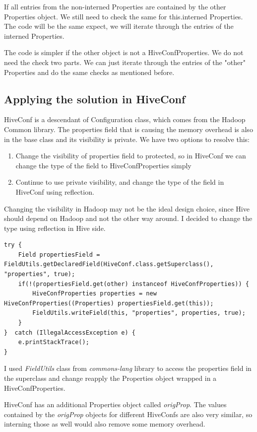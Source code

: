 If all entries from the non-interned Properties are contained by the other Properties object. We still need to check the same for this.interned Properties. The code will be the same expect, we will iterate through the entries of the interned Properties. 

The code is simpler if the other object is not a HiveConfProperties. We do not need the check two parts. We can just iterate through the entries of the "other" Properties and do the same checks as mentioned before.

\subsection{Applying the solution in HiveConf}
HiveConf is a descendant of Configuration class, which comes from the Hadoop Common library. The properties field that is causing the memory overhead is also in the base class and its visibility is private. We have two options to resolve this:
\begin{enumerate}
	\item Change the visibility of properties field to protected, so in HiveConf we can change the type of the field to HiveConfProperties simply
	\item Continue to use private visibility, and change the type of the field in HiveConf using reflection.
\end{enumerate}

Changing the visibility in Hadoop may not be the ideal design choice, since Hive should depend on Hadoop and not the other way around. I decided to change the type using reflection in Hive side. 

\begin{lstlisting}
try {
	Field propertiesField = FieldUtils.getDeclaredField(HiveConf.class.getSuperclass(), "properties", true);
	if(!(propertiesField.get(other) instanceof HiveConfProperties)) {
		HiveConfProperties properties = new HiveConfProperties((Properties) propertiesField.get(this));
		FieldUtils.writeField(this, "properties", properties, true);
	}
}  catch (IllegalAccessException e) {
	e.printStackTrace();
}
\end{lstlisting}

I used \textit{FieldUtils} class from \textit{commons-lang} library to access the properties field in the superclass and change reapply the Properties object wrapped in a HiveConfProperties.

HiveConf has an additional Properties object called \textit{origProp}. The values contained by the \textit{origProp} objects for different HiveConfs are also very similar, so interning those as well would also remove some memory overhead. 

